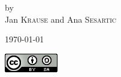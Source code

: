 \begin{titlepage}
\begin{center}



\vspace{3cm}


by\\
\vspace{1.0cm}
{\Large Jan \textsc{Krause} and \Large Ana \textsc{Sesartic}} 

\vfill

{\large \today}

\includegraphics{./images/CC-By-SA_88x31.png}

\end{center}

\end{titlepage}

